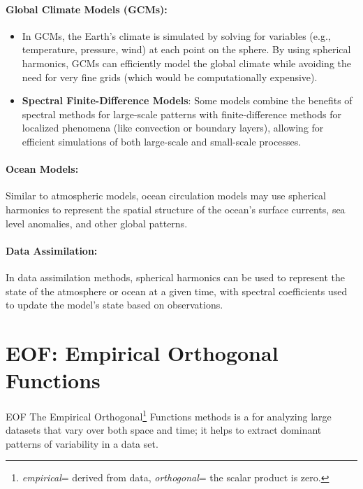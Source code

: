 \paragraph{\textbf{Global Climate Models (GCMs)}:}

\begin{itemize}
	\item In GCMs, the Earth's climate is simulated by solving for variables (e.g., temperature, pressure, wind) at each point on the sphere. By using spherical harmonics, GCMs can efficiently model the global climate while avoiding the need for very fine grids (which would be computationally expensive).
	\item \textbf{Spectral Finite-Difference Models}: Some models combine the benefits of spectral methods for large-scale patterns with finite-difference methods for localized phenomena (like convection or boundary layers), allowing for efficient simulations of both large-scale and small-scale processes.
\end{itemize}

\paragraph{\textbf{Ocean Models}:}

Similar to atmospheric models, ocean circulation models may use spherical harmonics to represent the spatial structure of the ocean's surface currents, sea level anomalies, and other global patterns.

\paragraph{\textbf{Data Assimilation}:}

In data assimilation methods, spherical harmonics can be used to represent the state of the atmosphere or ocean at a given time, with spectral coefficients used to update the model's state based on observations.


\section{EOF: Empirical Orthogonal Functions}\label{sec:EOF}

\begin{defn}{EOF}
	{
		The Empirical Orthogonal\footnote{\textit{empirical}= derived from data, \textit{orthogonal}= the scalar product is zero.}
		Functions methods is a for analyzing large datasets that vary over both space and time; it helps to extract dominant patterns of variability in a data set.
	}
\end{defn}
